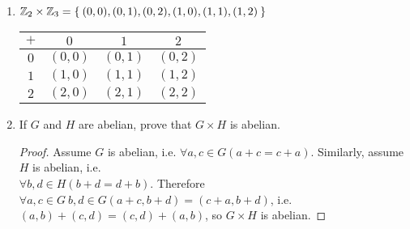 \begin{enumerate}[label={\Alph*.},font={\bfseries}]
\begin{enumerate}[label={\arabic*},font={\bfseries}]
\begin{proof}
\begin{enumerate}[label={(G\arabic*)}]
\begin{align*}
        \end{align*}
      \item Let $e_G$ be the identity element of $G$, and $e_H$ the identity element of $H$.
        The identity element of $G \times H$ is $(e_G,e_H)$.
        \begin{alignat*}{3}
          &(x,y)(e_G,e_H) &&= (xe_G,ye_H) &&= (x,y) \\
          \\
          &(e_G,e_H)(x,y) &&= (e_Gx,e_Hy) &&= (x,y)
        \end{alignat*}
      \item $\forall (a,b) \in G \times H \left( (a,b)\inv = (a\inv,b\inv) \right)$
        \begin{alignat*}{4}
          &(a,b)(a\inv,b\inv) &&= (aa\inv,bb\inv) &&= (e_G,e_H) &&= e_{G \times H}\\
          \\
          &(a\inv,b\inv)(a,b) &&= ({a\inv}a,{b\inv}b) &&= (e_G,e_H) &&= e_{G \times H}
        \end{alignat*}
      \end{enumerate}
    \end{proof}
  \item $\mathbb{Z}_2 \times \mathbb{Z}_3 = \Set{(0,0),(0,1),(0,2),(1,0),(1,1),(1,2)}$
    \begin{tabular}{ c | c c c }
      $+$ & $0$ & $1$ & $2$ \\
      \hline
      $0$ & $(0,0)$ & $(0,1)$ & $(0,2)$ \\
      $1$ & $(1,0)$ & $(1,1)$ & $(1,2)$ \\
      $2$ & $(2,0)$ & $(2,1)$ & $(2,2)$
    \end{tabular}
  \item If $G$ and $H$ are abelian, prove that $G \times H$ is abelian.
    \begin{proof}
      Assume $G$ is abelian, i.e. $\forall a,c \in G (a+c = c+a)$. Similarly, assume $H$ is abelian, i.e. \\
      $\forall b,d \in H (b+d = d+b)$.
      Therefore $\forall a,c \in G\ b,d \in G (a+c,b+d) = (c+a,b+d)$, i.e. $(a,b)+(c,d) = (c,d)+(a,b)$, so $G \times H$ is abelian.

\end{proof}
\end{enumerate}
\end{enumerate}
